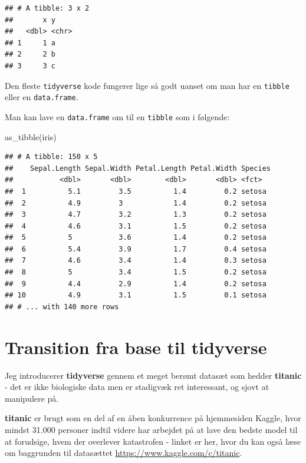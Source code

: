 \documentclass[
]{book}
\newenvironment{Shaded}{\begin{snugshade}}{\end{snugshade}}
\newcommand{\FunctionTok}[1]{\textcolor[rgb]{0.00,0.00,0.00}{#1}}
\newcommand{\NormalTok}[1]{#1}
\begin{document}
\begin{verbatim}
## # A tibble: 3 x 2
##       x y    
##   <dbl> <chr>
## 1     1 a    
## 2     2 b    
## 3     3 c
\end{verbatim}

Den fleste \texttt{tidyverse} kode fungerer lige så godt uanset om man har en \texttt{tibble} eller en \texttt{data.frame}.

Man kan lave en \texttt{data.frame} om til en \texttt{tibble} som i følgende:

\begin{Shaded}
\begin{Highlighting}[]
\FunctionTok{as\_tibble}\NormalTok{(iris)}
\end{Highlighting}
\end{Shaded}

\begin{verbatim}
## # A tibble: 150 x 5
##    Sepal.Length Sepal.Width Petal.Length Petal.Width Species
##           <dbl>       <dbl>        <dbl>       <dbl> <fct>  
##  1          5.1         3.5          1.4         0.2 setosa 
##  2          4.9         3            1.4         0.2 setosa 
##  3          4.7         3.2          1.3         0.2 setosa 
##  4          4.6         3.1          1.5         0.2 setosa 
##  5          5           3.6          1.4         0.2 setosa 
##  6          5.4         3.9          1.7         0.4 setosa 
##  7          4.6         3.4          1.4         0.3 setosa 
##  8          5           3.4          1.5         0.2 setosa 
##  9          4.4         2.9          1.4         0.2 setosa 
## 10          4.9         3.1          1.5         0.1 setosa 
## # ... with 140 more rows
\end{verbatim}

\hypertarget{transition-fra-base-til-tidyverse}{%
\section{Transition fra base til tidyverse}\label{transition-fra-base-til-tidyverse}}

Jeg introducerer \textbf{tidyverse} gennem et meget berømt datasæt som hedder \textbf{titanic} - det er ikke biologiske data men er stadigvæk ret interessant, og sjovt at manipulere på.

\textbf{titanic} er brugt som en del af en åben konkurrence på hjemmesiden Kaggle, hvor mindst 31.000 personer indtil videre har arbejdet på at lave den bedste model til at forudsige, hvem der overlever katastrofen - linket er her, hvor du kan også læse om baggrunden til datasættet \url{https://www.kaggle.com/c/titanic}.
\end{document}
